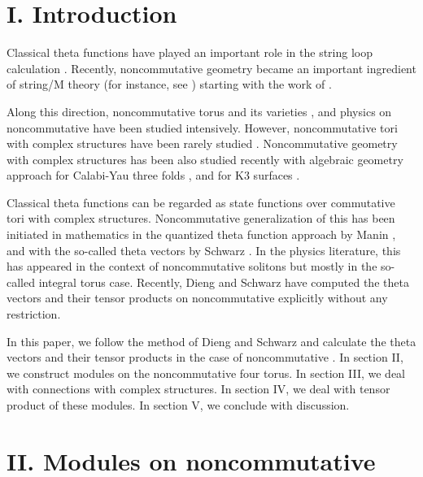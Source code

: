 \documentclass[12pt, a4paper]{article}
\providecommand{\R}{{\mathbb R}}
\begin{document}
\vfill


\thispagestyle{empty}

\newpage
\section*{I. Introduction}

Classical theta functions have played an important role in the
string loop calculation \cite{jp,gsw}. Recently, noncommutative
geometry \cite{conn} became an important ingredient of string/M
theory (for instance, see \cite{sw99}) starting with the work of
\cite{cds}.

Along this direction, noncommutative torus \cite{cr,rief88} and
its varieties \cite{nct,hv,t4ours}, and physics on noncommutative
\myHighlight{${\R}^4$}\coordHE{} \cite{ns98,gms00,dn01} have been studied intensively.
However, noncommutative tori with complex structures have been
rarely studied \cite{manin,schwarz01,ds02}. Noncommutative
geometry with complex structures has been also studied recently
with algebraic geometry approach for Calabi-Yau three folds
\cite{bl,bs1,bs2}, and for K3 surfaces \cite{kl}.

Classical theta functions can be regarded as state functions over
commutative tori with complex structures. Noncommutative
generalization of this has been initiated in mathematics in the
quantized theta function approach by Manin \cite{manin}, and with
the so-called theta vectors by Schwarz \cite{schwarz01}. In the
physics literature, this has appeared in the context of
noncommutative solitons \cite{mm01,ghs01,hsy02} but mostly in the
so-called integral torus case. Recently, Dieng and Schwarz
\cite{ds02} have computed the theta vectors and their tensor
products on noncommutative \coordHE{} explicitly without any
restriction.

In this paper, we follow the method of Dieng and Schwarz and
calculate the theta vectors and their tensor products in the case
of noncommutative \coordHE{}.
 In section II, we construct modules on
the noncommutative four torus. In section III, we deal with
connections with complex structures. In section IV, we deal with
tensor product of these modules. In section V, we conclude with
discussion.
\\


\section*{II. Modules on noncommutative \coordHE{} }\label{module}
\end{document}
